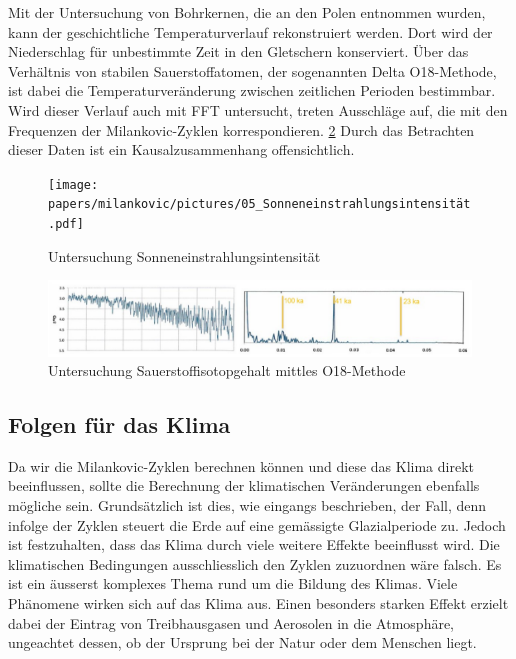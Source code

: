 Mit der Untersuchung von Bohrkernen, die an den Polen entnommen wurden, kann der geschichtliche Temperaturverlauf rekonstruiert werden.
Dort wird der Niederschlag für unbestimmte Zeit in den Gletschern konserviert. Über das Verhältnis von stabilen Sauerstoffatomen, der sogenannten Delta O18-Methode, ist dabei die Temperaturveränderung zwischen zeitlichen Perioden bestimmbar.
Wird dieser Verlauf auch mit FFT untersucht, treten Ausschläge auf, die mit den Frequenzen der Milankovic-Zyklen korrespondieren.
\ref{pictureUntersuchungKonzentration}
Durch das Betrachten dieser Daten ist ein Kausalzusammenhang offensichtlich.

\begin{figure}
	\centering
	\texttt{[image: papers/milankovic/pictures/05\_Sonneneinstrahlungsintensität.pdf]}
	\caption{Untersuchung Sonneneinstrahlungsintensität
		\label{pictureUntersuchungSonneneinstrahlungsintensität}}
\end{figure}
\begin{figure}
	\centering
	\includegraphics[width=\linewidth]{papers/milankovic/pictures/06_O18-Konzentration.pdf}
	\caption{Untersuchung Sauerstoffisotopgehalt mittles O18-Methode
		\label{pictureUntersuchungKonzentration}}
\end{figure}

\subsection{Folgen für das Klima
	\label{milankovic:subsection:FolgenKlima}}
Da wir die Milankovic-Zyklen berechnen können und diese das Klima direkt beeinflussen, sollte die Berechnung der klimatischen Veränderungen ebenfalls mögliche sein.
Grundsätzlich ist dies, wie eingangs beschrieben, der Fall, denn infolge der Zyklen steuert die Erde auf eine gemässigte Glazialperiode zu.
Jedoch ist festzuhalten, dass das Klima durch viele weitere Effekte beeinflusst wird.
Die klimatischen Bedingungen ausschliesslich den Zyklen zuzuordnen wäre falsch.
Es ist ein äusserst komplexes Thema rund um die Bildung des Klimas.
Viele Phänomene wirken sich auf das Klima aus.
Einen besonders starken Effekt erzielt dabei der Eintrag von Treibhausgasen und Aerosolen in die Atmosphäre, ungeachtet dessen, ob der Ursprung bei der Natur oder dem Menschen liegt.


